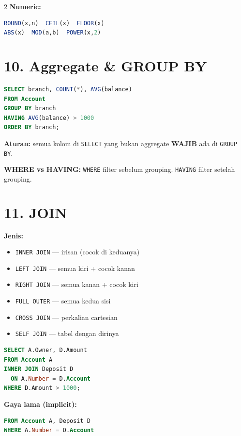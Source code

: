 \documentclass[10pt,a4paper]{article}
\begin{document}
\begin{multicols*}{2}
	\textbf{Numeric:}
	\begin{lstlisting}[language=SQL]
ROUND(x,n)  CEIL(x)  FLOOR(x)
ABS(x)  MOD(a,b)  POWER(x,2)
\end{lstlisting}

	\section*{10. Aggregate \& GROUP BY}

	\begin{lstlisting}[language=SQL]
SELECT branch, COUNT(*), AVG(balance)
FROM Account
GROUP BY branch
HAVING AVG(balance) > 1000
ORDER BY branch;
\end{lstlisting}

	\textbf{Aturan:} semua kolom di \texttt{SELECT} yang bukan aggregate \textbf{WAJIB} ada di \texttt{GROUP BY}.

	\textbf{WHERE vs HAVING:} \texttt{WHERE} filter sebelum grouping. \texttt{HAVING} filter setelah grouping.

	\section*{11. JOIN}

	\textbf{Jenis:}
	\begin{itemize}
		\item \texttt{INNER JOIN} — irisan (cocok di keduanya)
		\item \texttt{LEFT JOIN} — semua kiri + cocok kanan
		\item \texttt{RIGHT JOIN} — semua kanan + cocok kiri
		\item \texttt{FULL OUTER} — semua kedua sisi
		\item \texttt{CROSS JOIN} — perkalian cartesian
		\item \texttt{SELF JOIN} — tabel dengan dirinya
	\end{itemize}

	\begin{lstlisting}[language=SQL]
SELECT A.Owner, D.Amount
FROM Account A
INNER JOIN Deposit D
  ON A.Number = D.Account
WHERE D.Amount > 1000;
\end{lstlisting}

	\textbf{Gaya lama (implicit):}
	\begin{lstlisting}[language=SQL]
FROM Account A, Deposit D
WHERE A.Number = D.Account
\end{lstlisting}


\end{multicols*}
\end{document}
